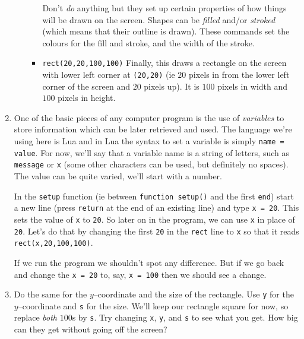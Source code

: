 \documentclass[
  xhtml,%
  text
]{internet}
\begin{document}
\begin{enumerate}
\begin{itemize}
\begin{itemize}
Don't \emph{do} anything but they set up certain properties of how things will be drawn on the screen.
Shapes can be \emph{filled} and/or \emph{stroked} (which means that their outline is drawn).
These commands set the colours for the fill and stroke, and the width of the stroke.

\item \verb+rect(20,20,100,100)+ Finally, this draws a rectangle on the screen with lower left corner at \verb+(20,20)+ (ie \(20\) pixels in from the lower left corner of the screen and \(20\) pixels up).
It is \(100\) pixels in width and \(100\) pixels in height.
\end{itemize}
\end{itemize}

\item One of the basic pieces of any computer program is the use of \emph{variables} to store information which can be later retrieved and used.
The language we're using here is Lua and in Lua the syntax to set a variable is simply \verb+name = value+.
For now, we'll say that a variable name is a string of letters, such as \verb+message+ or \verb+x+ (some other characters can be used, but definitely no spaces).
The value can be quite varied, we'll start with a number.

In the \verb+setup+ function (ie between \verb+function setup()+ and the first \verb+end+) start a new line (press \verb+return+ at the end of an existing line) and type \verb+x = 20+.
This sets the value of \verb+x+ to \verb+20+.
So later on in the program, we can use \verb+x+ in place of \verb+20+.
Let's do that by changing the first \verb+20+ in the \verb+rect+ line to \verb+x+ so that it reads \verb+rect(x,20,100,100)+.

If we run the program we shouldn't spot any difference.
But if we go back and change the \verb+x = 20+ to, say, \verb+x = 100+ then we should see a change.

\item Do the same for the \(y\)--coordinate and the size of the rectangle.
Use \verb+y+ for the \(y\)--coordinate and \verb+s+ for the size.
We'll keep our rectangle square for now, so replace \emph{both} \(100\)s by \verb+s+.
Try changing \verb+x+, \verb+y+, and \verb+s+ to see what you get.
How big can they get without going off the screen?


\end{enumerate}
\end{document}
